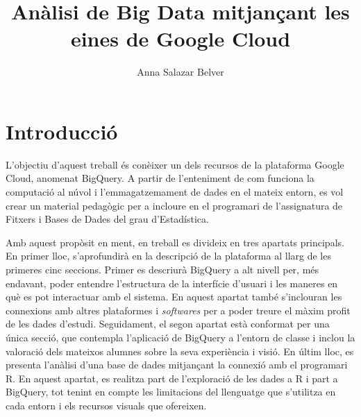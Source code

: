 \documentclass[12pt,longbibliography]{article}
\title{Anàlisi de Big Data mitjançant les eines de Google Cloud}
\author{Anna Salazar Belver}
\theoremstyle{definition}
\theoremstyle{remark}
\begin{document}
\begin{titlepage}

\maketitle

\vspace{140mm}

\par
{}%
\hfill
{}%
\par

\end{titlepage}

\tableofcontents

\pagebreak


\section{Introducció}

L'objectiu d'aquest treball és conèixer un dels recursos de la plataforma Google Cloud, anomenat BigQuery. A partir de l'enteniment de com funciona la computació al núvol i l'emmagatzemament de dades en el mateix entorn, es vol crear un material pedagògic per a incloure en el programari de l'assignatura de Fitxers i Bases de Dades del grau d'Estadística.

Amb aquest propòsit en ment, en treball es divideix en tres apartats principals. En primer lloc, s'aprofundirà en la descripció de la plataforma al llarg de les primeres cinc seccions. Primer es descriurà BigQuery a alt nivell per, més endavant, poder entendre l'estructura de la interfície d'usuari i les maneres en què es pot interactuar amb el sistema. En aquest apartat també s'inclouran les connexions amb altres plataformes i \emph{softwares} per a poder treure el màxim profit de les dades d'estudi. Seguidament, el segon apartat està conformat per una única secció, que contempla l'aplicació de BigQuery a l'entorn de classe i inclou la valoració dels mateixos alumnes sobre la seva experiència i visió. En últim lloc, es presenta l'anàlisi d'una base de dades mitjançant la connexió amb el programari R. En aquest apartat, es realitza part de l'exploració de les dades a R i part a BigQuery, tot tenint en compte les limitacions del llenguatge que s'utilitza en cada entorn i els recursos visuals que ofereixen. 
\end{document}
